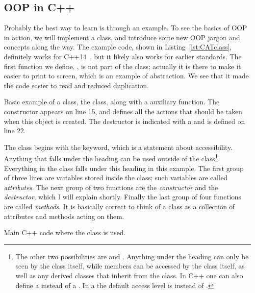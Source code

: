 \subsection{OOP in C++} 
Probably the best way to learn is through an example. To see the basics
of OOP in action, we will implement a  class, and 
introduce some new OOP jargon and concepts along the way.
The example code, shown in Listing~\ref{lst:CATclass}, 
definitely works for C++14~\cite{cppDocumentation},
but it likely also works for earlier standards.
The first function we define, , is not part of the class;
actually it is there to make it easier to print to screen, which is
an example of abstraction. We see that it made the code easier to
read and reduced duplication.

\begin{code*}
\caption{Basic example of a class, the  class, along with
a  auxiliary function. The constructor appears on line 15,
and defines all the actions that should be taken when this object
is created. The destructor is indicated with a \ff{\~} and is defined
on line 22.}
\label{lst:CATclass}
\end{code*}

The  class begins with the  keyword, which
is a statement about accessibility. Anything that falls under the
 heading can be used outside of the class\footnote{The other
two possibilities are  and . 
Anything under the  heading
can only be seen by the class itself, while  members can be accessed 
by the class itself, as well as any derived classes that inherit from the class.
In C++ one can also define a  instead of a .
In a  the default access level is  instead
of .}. 
Everything in the class falls
under this heading in this example. The first group of three lines
are variables stored inside the  class; such variables
are called {\it attributes}. The next group of two functions are
the {\it constructor} and the {\it destructor}, which I will explain
shortly. Finally the last group of four  functions are 
called {\it methods}. It is basically correct to think of a class as a
collection of attributes and methods acting on them.

\begin{code*}
\caption{Main C++ code where the  class is used.}
\label{lst:CATmain}
\end{code*}

